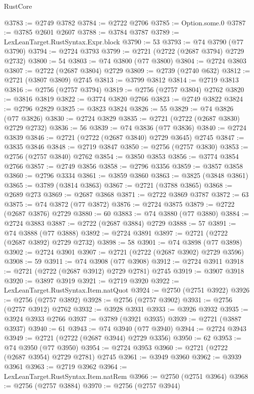 \begin{lexlean}{RustCore}
\begin{coremodule}
@3783 := @2749 @3782
@3784 := @2722 @2706
@3785 := Option.some.{0}
@3787 := @3785 @2601 @2607
@3788 := @3784 @3787
@3789 := LexLeanTarget.RustSyntax.Expr.block
@3790 := 53
@3793 := @74 @3790 (@77 @3790)
@3794 := @2724 @3793
@3799 := @2721 (@2722 (@2687 @3794) @2729 @2732)
@3800 := 54
@3803 := @74 @3800 (@77 @3800)
@3804 := @2724 @3803
@3807 := @2722 (@2687 @3804) @2729
@3809 := @2739 (@2740 @632)
@3812 := @2721 (@3807 @3809) @2745
@3813 := @3799 @3812
@3814 := @2719 @3813
@3816 := @2756 (@2757 @3794)
@3819 := @2756 (@2757 @3804) @2762
@3820 := @3816 @3819
@3822 := @3774 @3820 @2766
@3823 := @2749 @3822
@3824 := @2796 @2829
@3825 := @3823 @3824
@3826 := 55
@3829 := @74 @3826 (@77 @3826)
@3830 := @2724 @3829
@3835 := @2721 (@2722 (@2687 @3830) @2729 @2732)
@3836 := 56
@3839 := @74 @3836 (@77 @3836)
@3840 := @2724 @3839
@3846 := @2721 (@2722 (@2687 @3840) @2729 @3645) @2745
@3847 := @3835 @3846
@3848 := @2719 @3847
@3850 := @2756 (@2757 @3830)
@3853 := @2756 (@2757 @3840) @2762
@3854 := @3850 @3853
@3856 := @3774 @3854 @2766
@3857 := @2749 @3856
@3858 := @2796 @3356
@3859 := @3857 @3858
@3860 := @2796 @3334
@3861 := @3859 @3860
@3863 := @3825 (@3848 @3861)
@3865 := @3789 (@3814 @3863)
@3867 := @2721 (@3788 @3865)
@3868 := @2689 @273
@3869 := @2687 @3868
@3871 := @2722 @3869 @3787
@3872 := 63
@3875 := @74 @3872 (@77 @3872)
@3876 := @2724 @3875
@3879 := @2722 (@2687 @3876) @2729
@3880 := 60
@3883 := @74 @3880 (@77 @3880)
@3884 := @2724 @3883
@3887 := @2722 (@2687 @3884) @2729
@3888 := 57
@3891 := @74 @3888 (@77 @3888)
@3892 := @2724 @3891
@3897 := @2721 (@2722 (@2687 @3892) @2729 @2732)
@3898 := 58
@3901 := @74 @3898 (@77 @3898)
@3902 := @2724 @3901
@3907 := @2721 (@2722 (@2687 @3902) @2729 @3596)
@3908 := 59
@3911 := @74 @3908 (@77 @3908)
@3912 := @2724 @3911
@3918 := @2721 (@2722 (@2687 @3912) @2729 @2781) @2745
@3919 := @3907 @3918
@3920 := @3897 @3919
@3921 := @2719 @3920
@3922 := LexLeanTarget.RustSyntax.Item.natQuot
@3924 := @2750 (@2751 @3922)
@3926 := @2756 (@2757 @3892)
@3928 := @2756 (@2757 @3902)
@3931 := @2756 (@2757 @3912) @2762
@3932 := @3928 @3931
@3933 := @3926 @3932
@3935 := @3924 @3933 @2766
@3937 := @3789 (@3921 @3935)
@3939 := @2721 (@3887 @3937)
@3940 := 61
@3943 := @74 @3940 (@77 @3940)
@3944 := @2724 @3943
@3949 := @2721 (@2722 (@2687 @3944) @2729 @3356)
@3950 := 62
@3953 := @74 @3950 (@77 @3950)
@3954 := @2724 @3953
@3960 := @2721 (@2722 (@2687 @3954) @2729 @2781) @2745
@3961 := @3949 @3960
@3962 := @3939 @3961
@3963 := @2719 @3962
@3964 := LexLeanTarget.RustSyntax.Item.natRem
@3966 := @2750 (@2751 @3964)
@3968 := @2756 (@2757 @3884)
@3970 := @2756 (@2757 @3944)

\end{coremodule}
\end{lexlean}
